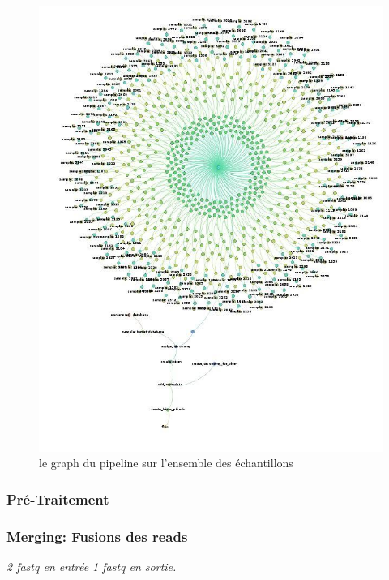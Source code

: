 \documentclass[12pt,a4paper]{article}
\begin{document}
\begin{figure}[ht]
\begin{center}
\includegraphics[scale=0.4]{img/dag.jpg}\hfill
\end{center}
\caption{le graph du pipeline sur l'ensemble des échantillons}
\label{dag}
\end{figure}


\subsubsection{Pré-Traitement}
\subsubsection{Merging: Fusions des reads}\begin{center}\emph{ 2 fastq en entrée 1 fastq en sortie. } \end{center}
\end{document}
